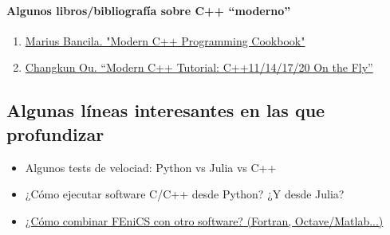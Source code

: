 \paragraph{Algunos libros/bibliografía sobre C++ ``moderno''}
\begin{enumerate}
\item \href{https://consense.com.ua/en/lib/book/cpp_modern_cpp_progr_cookbook}{Marius Bancila.
"Modern C++ Programming Cookbook"}
\item \href{https://changkun.de/modern-cpp/pdf/modern-cpp-tutorial-en-us.pdf}{Changkun Ou. ``Modern C++ Tutorial: C++11/14/17/20 On the Fly''}

\end{enumerate}


\subsection{Algunas líneas interesantes en las que profundizar}
\label{sec:01:profundizar}


\begin{itemize}
  \item Algunos tests de velociad: Python vs Julia vs C++
  \item ¿Cómo ejecutar software C/C++ desde Python? ¿Y desde Julia?
  \item \href{http://hplgit.github.io/fenics-mixed/doc/pub/fenics-mixed.html}{¿Cómo combinar FEniCS con otro software? (Fortran, Octave/Matlab...)}
\end{itemize}



